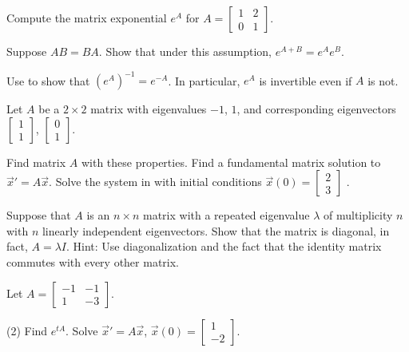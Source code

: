 \begin{exercise}
Compute the matrix exponential $e^A$ for
$A = \left[ \begin{smallmatrix} 1 & 2 \\ 0 & 1 \end{smallmatrix} \right]$.
\end{exercise}

\begin{exercise}[challenging] \label{matexp:explawex}
Suppose $AB = BA$.  Show that under this assumption, $e^{A+B} = e^A e^B$.
\end{exercise}

\begin{exercise} \label{matexp:expinvex}
Use 
to show that ${(e^{A})}^{-1} = e^{-A}$.  In particular,
$e^A$ is invertible even if $A$ is not.
\end{exercise}

\begin{exercise}
Let $A$ be a $2 \times 2$ matrix with eigenvalues $-1$, $1$, and
corresponding eigenvectors
$\left[ \begin{smallmatrix}
1 \\
1
\end{smallmatrix} \right]$,
$\left[ \begin{smallmatrix}
0 \\
1
\end{smallmatrix} \right]$.
\begin{tasks}
\task Find matrix $A$ with these properties.
\task Find a fundamental matrix solution to ${\vec{x}}' = A \vec{x}$.
\task Solve the system in with initial conditions $\vec{x}(0) =
\left[ \begin{smallmatrix}
2 \\
3
\end{smallmatrix} \right]$ .
\end{tasks}
\end{exercise}

\begin{exercise}
Suppose that $A$ is an $n \times n$ matrix with a repeated eigenvalue
$\lambda$ of multiplicity $n$ with
$n$ linearly independent eigenvectors.  Show that
the matrix is diagonal, in fact, $A = \lambda I$.  Hint: Use
diagonalization and the fact that the identity matrix commutes with every
other matrix.
\end{exercise}

\begin{exercise}
Let $A = \left[ \begin{smallmatrix}
-1 & -1 \\
1 & -3
\end{smallmatrix} \right]$.
\begin{tasks}(2)
\task Find $e^{tA}$.
\task Solve
${\vec{x}}' = A \vec{x}$, $\vec{x}(0) =
\left[ \begin{smallmatrix}
1 \\
-2
\end{smallmatrix} \right]$.
\end{tasks}
\end{exercise}

